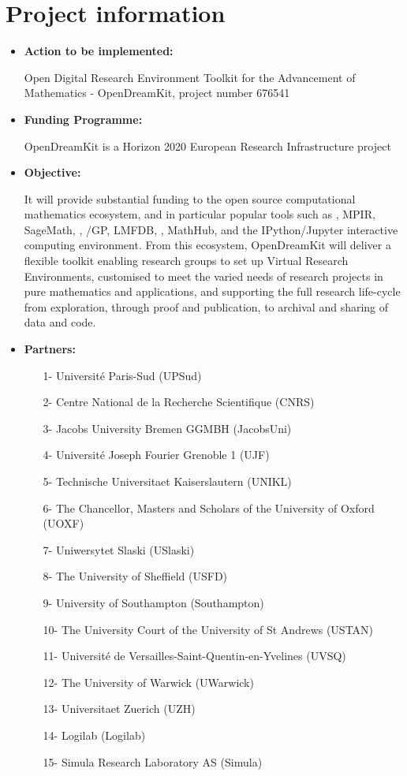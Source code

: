 \documentclass{../../Proposal/LaTeX-proposal/deliverablereport}
\begin{document}
\section{Project information}
\begin{itemize}
\item\textbf{Action to be implemented:}


Open Digital Research Environment Toolkit for the Advancement of Mathematics - OpenDreamKit, project number 676541
\item\textbf{Funding Programme:}


OpenDreamKit is a Horizon 2020 European Research Infrastructure project 
\item\textbf{Objective:}


It will provide substantial funding to the open source computational mathematics ecosystem, and in particular popular tools such as \Linbox, MPIR, SageMath, \GAP, \Pari/GP, LMFDB, \Singular, MathHub, and the IPython/Jupyter interactive computing environment.
From this ecosystem, OpenDreamKit will deliver a flexible toolkit enabling research groups to set up Virtual Research Environments, customised to meet the varied needs of research projects in pure mathematics and applications, and supporting the full research life-cycle from exploration, through proof and publication, to archival and sharing of data and code.
\item\textbf{Partners:}


\begin{enumerate}
\item[1-] Université Paris-Sud (UPSud)
\item[2-] Centre National de la Recherche Scientifique (CNRS)
\item[3-] Jacobs University Bremen GGMBH (JacobsUni)
\item[4-] Université Joseph Fourier Grenoble 1 (UJF)
\item[5-] Technische Universitaet Kaiserslautern (UNIKL)
\item[6-] The Chancellor, Masters and Scholars of the University of Oxford (UOXF)
\item[7-] Uniwersytet Slaski (USlaski)
\item[8-] The University of Sheffield (USFD)
\item[9-] University of Southampton (Southampton)
\item[10-] The University Court of the University of St Andrews (USTAN)
\item[11-] Université de Versailles-Saint-Quentin-en-Yvelines (UVSQ)
\item[12-] The University of Warwick (UWarwick)
\item[13-] Universitaet Zuerich (UZH)
\item[14-] Logilab (Logilab)
\item[15-] Simula Research Laboratory AS (Simula)
\end{enumerate}
\end{itemize}
\end{document}
